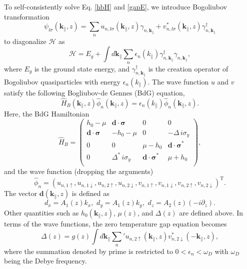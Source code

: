 \documentclass[11pt,revtex,aps]{report}
\newcommand{\kperp}{\mathbf{k}_\parallel}
\begin{document}
To self-consistently solve Eq. \eqref{hbH} and \eqref{gapE}, we introduce
Bogoliubov transformation
\begin{equation}
 \psi_{l \sigma}(\mathbf{k}_\parallel,z) = \sum_n  u_{n,l \sigma} (\kperp, z) \gamma_{n,\kperp} + v^\ast_{n,l \sigma} (\kperp, z) \gamma_{n,\kperp}^\dagger
\end{equation}
to diagonalize $\mathcal{H}$ as
\begin{equation}
\mathcal{H} = E_g + \int d \kperp\sum_n \epsilon_n(k_\parallel) \gamma_{n,\kperp}^\dagger \gamma_{n,\kperp} ,
\end{equation}
where $E_g$ is the ground state energy, and $\gamma_{n,\kperp}^\dagger$
is the creation operator of Bogoliubov quasiparticles with energy $\epsilon_n(k_\parallel)$.
The wave function $u$ and $v$ satisfy the following Bogliubov-de Gennes (BdG) equation,
\begin{equation}
\hat{H}_{B}(\mathbf{k}_\parallel,z) \hat{\phi}_n(\mathbf{k}_\parallel,z)=\epsilon_n(k_\parallel)\hat{\phi}_n (\mathbf{k}_\parallel,z).
\label{bdgsimp}
\end{equation}
Here, the BdG Hamiltonian
\begin{equation}
\hat{H}_{B}=\left( \begin{array}{cccc}
h_0 -\mu  & \mathbf{d} \cdot \boldsymbol{\sigma}&0&0\\ 
 \mathbf{d} \cdot \boldsymbol{\sigma} &-h_0 -\mu &0&-\Delta\, i\sigma_y\\ 
0 &0& \mu -h_0 & \mathbf{d} \cdot \boldsymbol{\sigma}^* \\
0 &\Delta^{\ast} \, i\sigma_y & \mathbf{d} \cdot \boldsymbol{\sigma}^* & \mu+h_0\\ 
 \end{array} \right), \label{bdgH} 
\end{equation}
and the wave function (dropping the arguments)
\begin{equation}
\hat{\phi}_n=(u_{n,1\uparrow}, u_{n,1\downarrow}, u_{n,2\uparrow}, u_{n,2\downarrow}, 
v_{n,1\uparrow}, v_{n,1\downarrow}, v_{n,2\uparrow}, v_{n,2\downarrow})^\mathrm{T}.
\end{equation}
The vector $\mathbf{d}(\mathbf{k}_\parallel,z)$ is defined as
\begin{equation}
d_x=A_1(z)k_x,\,\, d_y=A_1(z)k_y,\,\, d_z=A_2(z)(-i\partial_z).
\end{equation} 
Other quantities such as $h_0(\mathbf{k}_\parallel,z)$, $\mu(z)$, and $\Delta(z)$ are 
defined above.
In terms of the wave functions, the zero temperature gap equation becomes
\begin{equation}
\Delta(z) = g(z) \int d \mathbf{k}_\parallel \sum_n' u_{n,2 \uparrow}(\mathbf{k}_\parallel,z) v^*_{n,2\downarrow}(-\mathbf{k}_\parallel,z) ,
\end{equation}
where the summation denoted by prime is restricted to $0<\epsilon_n<\omega_D$ with 
$\omega_D$ being the Debye frequency.
\end{document}
